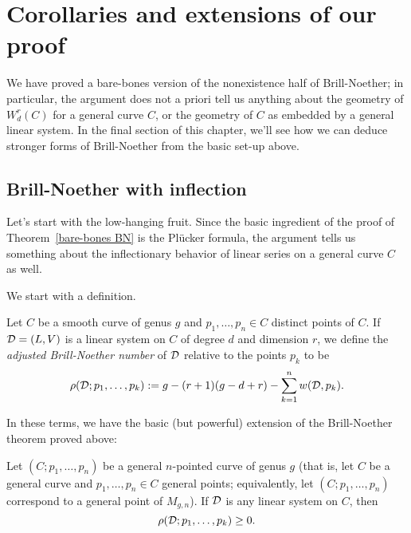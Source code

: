 \section{Corollaries and extensions of our proof}

We have proved a bare-bones version of the nonexistence half of Brill-Noether; in particular, the argument does not a priori tell us anything about the geometry of $W^r_d(C)$ for a general curve $C$, or the geometry of $C$ as embedded by a general linear system. In the final section of this chapter, we'll see how we can deduce stronger forms of Brill-Noether from the basic set-up above.

\subsection{Brill-Noether with inflection}

Let's start with the low-hanging fruit. Since the basic ingredient of the proof of Theorem~\ref{bare-bones BN} is the Pl\"ucker formula, the argument tells us something about the inflectionary behavior of linear series on a general curve $C$ as well.

We start with a definition.

\begin{definition}
Let $C$ be a smooth curve of genus $g$ and $p_1,\dots,p_n \in C$ distinct points of $C$. If ${\mathcal D} = (L,V)$ is a linear system on $C$ of degree $d$ and dimension $r$, we define the \emph{adjusted Brill-Noether number} of ${\mathcal D}$ relative to the points $p_k$ to be
$$
\rho({\mathcal D}; p_1,\dots,p_k) := g - (r+1)(g-d+r) - \sum_{k=1}^n w({\mathcal D},p_k).
$$
\end{definition}

In these terms, we have the basic (but powerful) extension of the Brill-Noether theorem proved above:

\begin{theorem}\label{Brill-Noether with inflection}
Let $(C;p_1,\dots,p_n)$ be a general $n$-pointed curve of genus $g$ (that is, let $C$ be a general curve and $p_1,\dots,p_n \in C$ general points; equivalently, let $(C;p_1,\dots,p_n)$ correspond to a general point of $M_{g,n}$). If ${\mathcal D}$ is any linear system on $C$, then
$$
\rho({\mathcal D}; p_1,\dots,p_k) \geq 0.
$$
\end{theorem}

